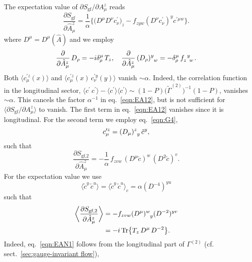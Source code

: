 \documentclass[twocolumn,aps,prd,amsmath,amssymb,preprintnumbers,longbibliography]{revtex4-1}
\numberwithin{equation}{section}
\DeclareMathOperator{\Tr}{Tr}
\newenvironment{alignedeqn}{\begin{equation}\begin{aligned}}{\end{aligned}\end{equation}\ignorespacesafterend}
\begin{document}
\begin{appendices}
The expectation value of $\partial S_\text{gf}/\partial A_\mu^z$ reads
\begin{equation}\label{eqn:EA12}
	\frac{\partial S_\text{gf}}{\partial \hat{A}_\mu^z}
	= \frac{1}{\alpha} \biggl\{\bigl(D^\mu D^\nu c_\nu^\prime\bigr)_z - f_{zyw}(D^\nu c_\nu^\prime)^y c^{\prime \mu w}\biggr\}.
\end{equation}
where $D^\mu = D^\mu(\hat{A})$ and we employ
\begin{equation}\label{eqn:EAW}
	\frac{\partial}{\partial \hat{A}_\mu^z} \, D_\rho
	= -i \delta_\rho^\mu \, T_z,
	\quad
	\frac{\partial}{\partial \hat{A}_\mu^z} \, \tensor{(D_\rho)}{^y_w}
	= -\delta_\rho^\mu \, \tensor{f}{_z^y_w}.
\end{equation}
Both $\langle c_\mu^{\prime z}(x)\rangle$ and $\langle c_\mu^{\prime z}(x) \, c_\nu^{\prime y}(y)\rangle$ vanish $\sim \alpha$. Indeed, the correlation function in the longitudinal sector, $\langle c^\prime \, c^\prime\rangle - \langle c^\prime\rangle \langle c^\prime\rangle \sim (1 - P) \bigl(\tilde\Gamma^{(2)}\bigr)^{-1} (1 - P)$, vanishes $\sim \alpha$. This cancels the factor $\alpha^{-1}$ in eq.~\eqref{eqn:EA12}, but is not sufficient for $\langle \partial S_\text{gf}/\partial A_\mu^z\rangle$ to vanish. The first term in eq.~\eqref{eqn:EA12} vanishes since it is longitudinal. For the second term we employ eq.~\eqref{eqn:G4},
\begin{equation}\label{eqn:EAY}
	c_\mu^{\prime z}
	= \tensor{(D_\mu)}{^z_y} \, \tilde{c}^y,
\end{equation}
such that
\begin{equation}\label{eqn:EAX}
	\frac{\partial S_\text{gf,2}}{\partial \hat{A}_\mu^z}
	= -\frac{1}{\alpha} \, f_{zvw} \, (D^\mu \tilde{c})^w \, (D^2 \tilde{c})^v.
\end{equation}
For the expectation value we use
\begin{equation}\label{eqn:EAN1}
	\langle\tilde{c}^y \, \tilde{c}^u\rangle
	= \langle\tilde{c}^y \, \tilde{c}^u\rangle_c
	= \alpha (D^{-4})^{yu}
\end{equation}
such that
\begin{alignedeqn}\label{eqn:EAN2}
	\biggl\langle\frac{\partial S_\text{gf,2}}{\partial \hat{A}_\mu^z}\biggr\rangle
	&= - f_{zvw} \tensor{(D^\mu)}{^w_y} (D^{-2})^{yv}\\
	&= -i \Tr\bigl\{T_z \, D^\mu \, D^{-2}\bigr\}.
\end{alignedeqn}
Indeed, eq.~\eqref{eqn:EAN1} follows from the longitudinal part of $\Gamma^{(2)}$ (cf. sect.~\ref{sec:gauge-invariant flow}),

\end{appendices}
\end{document}
